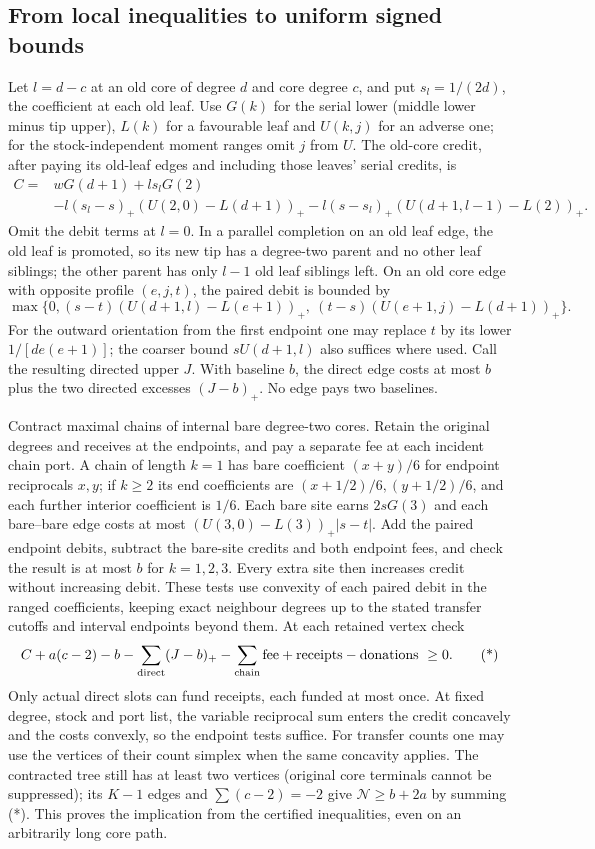 \documentclass[11pt]{article}
\theoremstyle{remark}
\numberwithin{equation}{section}
\begin{document}
\subsection{From local inequalities to uniform signed bounds}

Let $l=d-c$ at an old core of degree $d$ and core degree $c$, and put $s_l=1/(2d)$, the coefficient at each old leaf. Use $G(k)$ for the serial lower (middle lower minus tip upper), $L(k)$ for a favourable leaf and $U(k,j)$ for an adverse one; for the stock-independent moment ranges omit $j$ from $U$. The old-core credit, after paying its old-leaf edges and including those leaves' serial credits, is
\begin{align*}
 C={}& wG(d+1)+l s_l G(2)\\
 &-l(s_l-s)_+ (U(2,0)-L(d+1))_+
    -l(s-s_l)_+(U(d+1,l-1)-L(2))_+ .
\end{align*}
Omit the debit terms at $l=0$. In a parallel completion on an old leaf edge, the old leaf is promoted, so its new tip has a degree-two parent and no other leaf siblings; the other parent has only $l-1$ old leaf siblings left. On an old core edge with opposite profile $(e,j,t)$, the paired debit is bounded by
\[
 \max\{0,(s-t)(U(d+1,l)-L(e+1))_+,\
             (t-s)(U(e+1,j)-L(d+1))_+\} .
\]
For the outward orientation from the first endpoint one may replace $t$ by its lower $1/[d e(e+1)]$; the coarser bound $sU(d+1,l)$ also suffices where used. Call the resulting directed upper $J$. With baseline $b$, the direct edge costs at most $b$ plus the two directed excesses $(J-b)_+$. No edge pays two baselines.

Contract maximal chains of internal bare degree-two cores. Retain the original degrees and receives at the endpoints, and pay a separate fee at each incident chain port. A chain of length $k=1$ has bare coefficient $(x+y)/6$ for endpoint reciprocals $x,y$; if $k\ge2$ its end coefficients are $(x+1/2)/6,(y+1/2)/6$, and each further interior coefficient is $1/6$. Each bare site earns $2sG(3)$ and each bare--bare edge costs at most $(U(3,0)-L(3))_+|s-t|$. Add the paired endpoint debits, subtract the bare-site credits and both endpoint fees, and check the result is at most $b$ for $k=1,2,3$. Every extra site then increases credit without increasing debit. These tests use convexity of each paired debit in the ranged coefficients, keeping exact neighbour degrees up to the stated transfer cutoffs and interval endpoints beyond them. At each retained vertex check
\[
 C+a(c-2)-b-\sum_{\rm direct}(J-b)_+-\sum_{\rm chain}\mathrm{fee}
     +\mathrm{receipts}-\mathrm{donations}\ \ge0 .                 \tag{*}
\]
Only actual direct slots can fund receipts, each funded at most once. At fixed degree, stock and port list, the variable reciprocal sum enters the credit concavely and the costs convexly, so the endpoint tests suffice. For transfer counts one may use the vertices of their count simplex when the same concavity applies. The contracted tree still has at least two vertices (original core terminals cannot be suppressed); its $K-1$ edges and $\sum(c-2)=-2$ give $\mathcal N\ge b+2a$ by summing (*). This proves the implication from the certified inequalities, even on an arbitrarily long core path.
\end{document}

